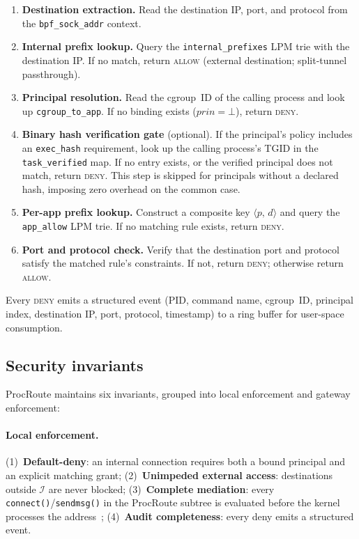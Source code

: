 \documentclass[sigconf]{acmart}
\begin{document}
\begin{enumerate}
  \item \textbf{Destination extraction.}
    Read the destination IP, port, and protocol from the
    \texttt{bpf\_sock\_addr} context.
  \item \textbf{Internal prefix lookup.}
    Query the \texttt{internal\_prefixes} LPM trie with the
    destination IP.  If no match, return \textsc{allow} (external
    destination; split-tunnel passthrough).
  \item \textbf{Principal resolution.}
    Read the cgroup~ID of the calling process and look
    up \texttt{cgroup\_to\_app}.  If no binding exists
    ($\mathit{prin} = \bot$), return \textsc{deny}.
  \item \textbf{Binary hash verification gate} (optional).
    If the principal's policy includes an \texttt{exec\_hash}
    requirement, look up the calling process's TGID in the
    \texttt{task\_verified} map.  If no entry exists, or the
    verified principal does not match, return \textsc{deny}.
    This step is skipped for principals without a declared hash,
    imposing zero overhead on the common case.
  \item \textbf{Per-app prefix lookup.}
    Construct a composite key $\langle p,\, d \rangle$ and query the
    \texttt{app\_allow} LPM trie.  If no matching rule exists, return
    \textsc{deny}.
  \item \textbf{Port and protocol check.}
    Verify that the destination port and protocol satisfy the matched
    rule's constraints.  If not, return \textsc{deny}; otherwise
    return \textsc{allow}.
\end{enumerate}

Every \textsc{deny} emits a structured event (PID, command
name, cgroup~ID, principal index, destination IP, port, protocol,
timestamp) to a ring buffer for user-space consumption.

\subsection{Security invariants}
\label{sec:invariants}

ProcRoute maintains six invariants, grouped into local enforcement and
gateway enforcement:

\paragraph{Local enforcement.}
(1)~\textbf{Default-deny}: an internal connection requires both a bound principal
and an explicit matching grant;
(2)~\textbf{Unimpeded external access}: destinations outside
$\mathcal{I}$ are never blocked;
(3)~\textbf{Complete mediation}: every \texttt{connect()}/\texttt{sendmsg()} in the ProcRoute subtree is evaluated before
the kernel processes the address~\cite{kernel_bpf_cgroup,kernel_cgroup2};
(4)~\textbf{Audit completeness}: every deny emits a structured event.
\end{document}
